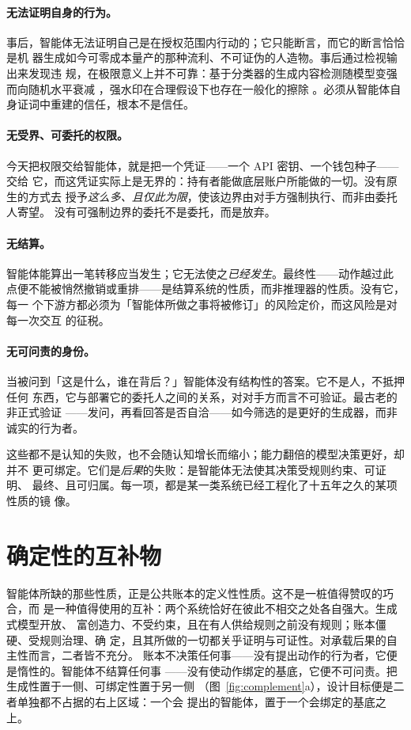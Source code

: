 \documentclass[11pt,UTF8]{ctexart}
\begin{document}
\paragraph{无法证明自身的行为。}
事后，智能体无法证明自己是在授权范围内行动的；它只能断言，而它的断言恰恰是机
器生成如今可零成本量产的那种流利、不可证伪的人造物。事后通过检视输出来发现违
规，在极限意义上并不可靠：基于分类器的生成内容检测随模型变强而向随机水平衰减
\citep{sadasivan2023detection}，强水印在合理假设下也存在一般化的擦除
\citep{zhang2023watermarks}。必须从智能体自身证词中重建的信任，根本不是信任。

\paragraph{无受界、可委托的权限。}
今天把权限交给智能体，就是把一个凭证——一个 API 密钥、一个钱包种子——交给
它，而这凭证实际上是无界的：持有者能做底层账户所能做的一切。没有原生的方式去
授予\emph{这么多、且仅此为限}，使该边界由对手方强制执行、而非由委托人寄望。
没有可强制边界的委托不是委托，而是放弃。

\paragraph{无结算。}
智能体能算出一笔转移应当发生；它无法使之\emph{已经发生}。最终性——动作越过此
点便不能被悄然撤销或重排——是结算系统的性质，而非推理器的性质。没有它，每一
个下游方都必须为「智能体所做之事将被修订」的风险定价，而这风险是对每一次交互
的征税。

\paragraph{无可问责的身份。}
当被问到「这是什么，谁在背后？」智能体没有结构性的答案。它不是人，不抵押任何
东西，它与部署它的委托人之间的关系，对对手方而言不可验证。最古老的非正式验证
——发问，再看回答是否自洽——如今筛选的是更好的生成器，而非诚实的行为者。

这些都不是认知的失败，也不会随认知增长而缩小；能力翻倍的模型决策更好，却并不
更可绑定。它们是\emph{后果}的失败：是智能体无法使其决策受规则约束、可证明、
最终、且可归属。每一项，都是某一类系统已经工程化了十五年之久的某项性质的镜
像。
\section{确定性的互补物}
\label{sec:complement}

智能体所缺的那些性质，正是公共账本的定义性性质。这不是一桩值得赞叹的巧合，而
是一种值得使用的互补：两个系统恰好在彼此不相交之处各自强大。生成式模型开放、
富创造力、不受约束，且在有人供给规则之前没有规则；账本僵硬、受规则治理、确
定，且其所做的一切都关乎证明与可证性。对承载后果的自主性而言，二者皆不充分。
账本不决策任何事——没有提出动作的行为者，它便是惰性的。智能体不结算任何事
——没有使动作绑定的基底，它便不可问责。把生成性置于一侧、可绑定性置于另一侧
（图~\ref{fig:complement}a），设计目标便是二者单独都不占据的右上区域：一个会
提出的智能体，置于一个会绑定的基底之上。
\end{document}
